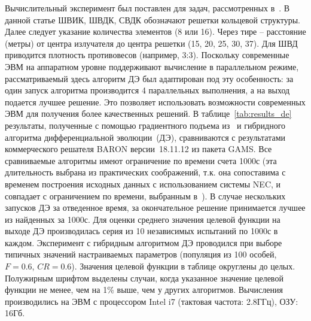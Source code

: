 Вычислительный эксперимент был поставлен для задач, рассмотренных в~\cite{tyu:daor,tyunin:oniip}. В данной
статье ШВИК, ШВДК, СВДК обозначают решетки кольцевой структуры. Далее следует указание количества элементов (8 или 16).
Через тире -- расстояние (метры) от центра излучателя до центра решетки (15, 20, 25, 30, 37). Для ШВД приводится плотность противовесов (например, 3:3). Поскольку современные ЭВМ на аппаратном уровне поддерживают вычисление в параллельном режиме, рассматриваемый здесь алгоритм ДЭ был адаптирован под эту особенность: за один запуск алгоритма производится 4 параллельных выполнения, а на выход подается лучшее решение. Это позволяет использовать возможности современных ЭВМ для получения более качественных решений.
В таблице~\ref{tab:results_de} результаты, полученные с помощью градиентного подъема из~\cite{tyu:daor} и гибридного алгоритма дифференциальной эволюции~(ДЭ),
сравниваются с результатами коммерческого решателя BARON версии~18.11.12 из пакета GAMS.
Все сравниваемые алгоритмы имеют ограничение по времени счета 1000с (эта длительность выбрана из практических соображений, т.к. она сопоставима с временем построения исходных данных с использованием системы NEC, и совпадает с ограничением по времени, выбранным в~\cite{tyu:daor}).
В случае нескольких запусков ДЭ за отведенное время, за окончательное решение принимается лучшее из найденных за 1000с.
Для оценки среднего значения целевой функции на выходе ДЭ производилась серия из 10 независимых испытаний по
1000с в каждом. Эксперимент с гибридным алгоритмом ДЭ проводился при выборе типичных значений настраиваемых параметров
(популяция из 100 особей, $F=0.6$, $CR=0.6$). Значения целевой функции в таблице округлены до целых.
Полужирным шрифтом выделены случаи, когда указанное значение целевой функции не менее, чем на 1\% выше, чем у других алгоритмов.
Вычисления производились на ЭВМ с процессором Intel i7 (тактовая частота: 2.8ГГц), ОЗУ: 16Гб.


